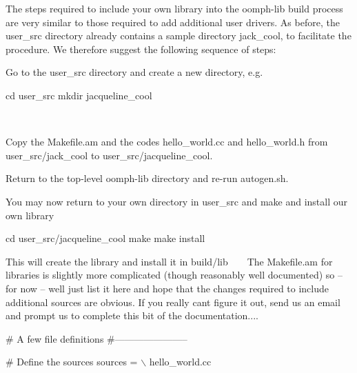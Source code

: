The steps required to include your own library into the {\ttfamily oomph-\/lib} build process are very similar to those required to add additional user drivers. As before, the {\ttfamily user\+\_\+src} directory already contains a sample directory {\ttfamily jack\+\_\+cool}, to facilitate the procedure. We therefore suggest the following sequence of steps\+:
\begin{DoxyEnumerate}
\item Go to the {\ttfamily user\+\_\+src} directory and create a new directory, e.\+g. 
\begin{DoxyCode}
cd user\_src
mkdir jacqueline\_cool
\end{DoxyCode}
 ~\newline
~\newline

\item Copy the {\ttfamily Makefile.\+am} and the codes {\ttfamily hello\+\_\+world.\+cc} and {\ttfamily hello\+\_\+world.\+h} from {\ttfamily user\+\_\+src/jack\+\_\+cool} to {\ttfamily user\+\_\+src/jacqueline\+\_\+cool}. ~\newline
~\newline

\item Return to the top-\/level {\ttfamily oomph-\/lib} directory and re-\/run {\ttfamily autogen.\+sh}.
\item You may now return to your own directory in {\ttfamily user\+\_\+src} and make and install our own library 
\begin{DoxyCode}
cd user\_src/jacqueline\_cool
make
make install
\end{DoxyCode}
 This will create the library and install it in {\ttfamily build/lib} ~\newline
~\newline
 The {\ttfamily Makefile}.{\ttfamily am} for libraries is slightly more complicated (though reasonably well documented) so -- for now -- we\textquotesingle{}ll just list it here and hope that the changes required to include additional sources are obvious. If you really can\textquotesingle{}t figure it out, send us an email and prompt us to complete this bit of the documentation.... ~\newline
~\newline

\begin{DoxyCodeInclude}
# A few file definitions
#-----------------------

# Define the sources
sources =  \(\backslash\)
hello\_world.cc


\end{DoxyCodeInclude}
\end{DoxyEnumerate}
